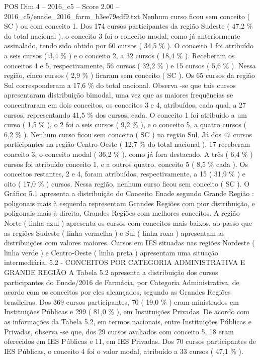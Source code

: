 \begin{textsample}{POS Dim 4 – 2016\_c5 – Score 2.00 – 2016\_c5/enade\_2016\_farm\_b3ee79edf9.txt}
Nenhum curso ficou sem conceito ( SC ) ou com conceito 1.
Dos 174 cursos participantes da região Sudeste ( 47,2 \% do total nacional ), o conceito 3 foi o conceito modal, como já anteriormente assinalado, tendo sido obtido por 60 cursos ( 34,5 \% ).
O conceito 1 foi atribuído a seis cursos ( 3,4 \% ) e o conceito 2, a 32 cursos ( 18,4 \% ).
Receberam os conceitos 4 e 5, respectivamente, 56 cursos ( 32,2 \% ) e 15 cursos ( 5,6 \% ).
Nessa região, cinco cursos ( 2,9 \% ) ficaram sem conceito ( SC ).
Os 65 cursos da região Sul corresponderam a 17,6 \% do total nacional.
Observa -se que tais cursos apresentaram distribuição bimodal, uma vez que as maiores frequências se concentraram em dois conceitos, os conceitos 3 e 4, atribuídos, cada qual, a 27 cursos, representando 41,5 \% dos cursos, cada.
O conceito 1 foi atribuído a um curso ( 1,5 \% ), o 2 foi a seis cursos ( 9,2 \% ), e o conceito 5, a quatro cursos ( 6,2 \% ).
Nenhum curso ficou sem conceito ( SC ) na região Sul.
Já dos 47 cursos participantes na região Centro-Oeste ( 12,7 \% do total nacional ), 17 receberam conceito 3, o conceito modal ( 36,2 \% ), como já fora destacado.
A três ( 6,4 \% ) cursos foi atribuído conceito 1, e a outros quatro, conceito 5 ( 8,5 \% cada ).
Os conceitos restantes, 2 e 4, foram atribuídos, respectivamente, a 15 ( 31,9 \% ) e oito ( 17,0 \% ) cursos.
Nessa região, nenhum curso ficou sem conceito ( SC ).
O Gráfico 5.1 apresenta a distribuição do Conceito Enade segundo Grande Região : poligonais mais à esquerda representam Grandes Regiões com pior distribuição, e poligonais mais à direita, Grandes Regiões com melhores conceitos.
A região Norte ( linha azul ) apresenta os cursos com conceitos mais baixos, ao passo que as regiões Sudeste ( linha vermelha ) e Sul ( linha roxa ) apresentam as distribuições com valores maiores.
Cursos em IES situadas nas regiões Nordeste ( linha verde ) e Centro-Oeste ( linha preta ) apresentam uma situação intermediária. 5.2 - CONCEITOS POR CATEGORIA ADMINISTRATIVA E GRANDE REGIÃO A Tabela 5.2 apresenta a distribuição dos cursos participantes do Enade/2016 de Farmácia, por Categoria Administrativa, de acordo com os conceitos por eles alcançados, segundo as Grandes Regiões brasileiras.
Dos 369 cursos participantes, 70 ( 19,0 \% ) eram ministrados em Instituições Públicas e 299 ( 81,0 \% ), em Instituições Privadas.
De acordo com as informações da Tabela 5.2, em termos nacionais, entre Instituições Públicas e Privadas, observa -se que, dos 29 cursos avaliados com conceito 5, 18 eram oferecidos em IES Públicas e 11, em IES Privadas.
Dos 70 cursos participantes de IES Públicas, o conceito 4 foi o valor modal, atribuído a 33 cursos ( 47,1 \% ).

\end{textsample}
